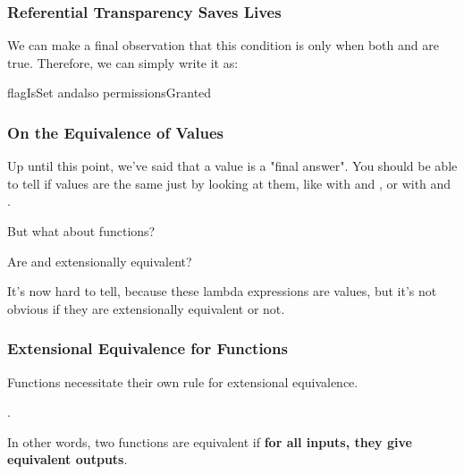\documentclass[aspectratio=169]{beamer}
\begin{document}
\begin{frame}[fragile]
  \frametitle{Referential Transparency Saves Lives}

  We can make a final observation that this condition is only
   when both  and 
  are true. Therefore, we can simply write it as:

  \pause
  \vspace{\fill}

  \begin{codeblock}
    flagIsSet andalso permissionsGranted
  \end{codeblock}

  \pause
  \vspace{\fill}


\end{frame}

\begin{frame}[fragile]
  \frametitle{On the Equivalence of Values}

  Up until this point, we've said that a value is a "final answer". You should be able
  to tell if values are the same just by looking at them, like with  and ,
  or with  and .

  \vspace{\fill}

  But what about functions?

  \pause
  \vspace{5pt}

  Are  and  extensionally equivalent?

  \pause
  \vspace{\fill}

  It's now hard to tell, because these lambda expressions are values, but it's not obvious 
  if they are extensionally equivalent or not.
\end{frame}

\begin{frame}[fragile]
  \frametitle{Extensional Equivalence for Functions}

  Functions necessitate their own rule for extensional equivalence.

  \pause
  \vspace{\fill}

  .

  \pause
  \vspace{5pt}

  In other words, two functions are equivalent if \textbf{for all inputs, they give equivalent outputs}.

  \pause
  \vspace{\fill}
  
\end{frame}
\end{document}
